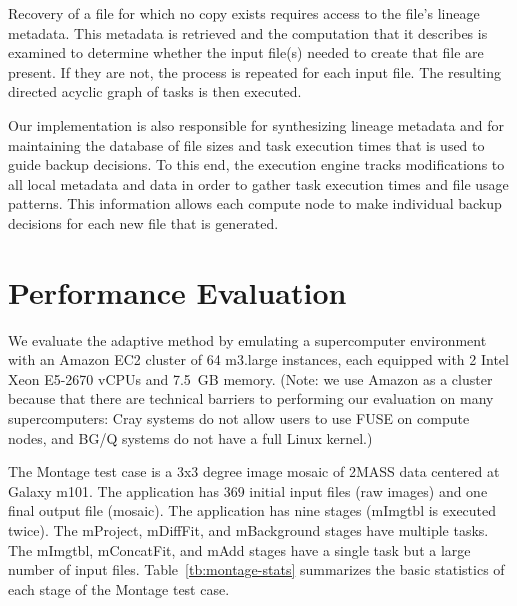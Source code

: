 \documentclass{sig-alternate}
\newcommand{\katznote}[1]{ {\textcolor{blue}    { ***Dan:      #1 }}}
\newcommand{\zhaonote}[1]{{\textcolor{cyan}    { ***Zhao:      #1 }}}
\newcommand{\katznote}[1]{}
\newcommand{\zhaonote}[1]{}
\begin{document}
Recovery of a file for which no copy exists requires access to the file's lineage metadata.
This metadata is retrieved and the computation that it describes is examined to
determine whether the input file(s) needed to create that file are present. If they are not, the process is repeated for each input file.
The resulting directed acyclic graph of tasks is then executed.

Our implementation is also responsible for synthesizing lineage metadata and for
maintaining the database of file sizes and task execution times that is
used to guide backup decisions. To this end, the execution engine tracks modifications to all
local metadata and data
in order to gather task execution times and file usage patterns.
This information allows each compute node to make individual backup decisions for each new
file that is generated.



\section{Performance Evaluation}
\label{sec:Perf}
We evaluate the adaptive method by emulating a supercomputer environment with an Amazon EC2 cluster of 64 m3.large instances, each equipped with 2 Intel Xeon E5-2670 vCPUs and 7.5~GB memory.  (Note: we use Amazon as a cluster because that there are technical barriers to performing our evaluation on many supercomputers: Cray systems do not allow users to use FUSE on compute nodes, and BG/Q systems do not have a full Linux kernel.)

The Montage test case is a 3x3 degree image mosaic of 2MASS data centered at Galaxy m101. 
The application has 369 initial input files (raw images) and one final output file (mosaic). 
The application has nine stages (mImgtbl is executed twice). 
The mProject, mDiffFit, and mBackground stages have multiple tasks. 
The mImgtbl, mConcatFit, and mAdd stages have a single task but a large number of input files. 
Table~\ref{tb:montage-stats} summarizes the basic statistics of each stage of the Montage test case.
\end{document}
